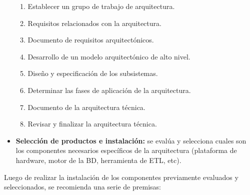 \documentclass[11pt,a4paper]{article}
\begin{document}
\begin{itemize}
				\begin{enumerate}[1.]
					\item Establecer un grupo de trabajo de arquitectura.
					\item Requisitos relacionados con la arquitectura.
					\item Documento de requisitos arquitectónicos.
					\item Desarrollo de un modelo arquitectónico de alto nivel.
					\item Diseño y especificación de los subsistemas.
					\item Determinar las fases de aplicación de la arquitectura.
					\item Documento de la arquitectura técnica.
					\item Revisar y finalizar la arquitectura técnica.
				\end{enumerate}
			
			\item \textbf{Selección de productos e instalación:} se evalúa y selecciona cuales son los componentes necesarios específicos de la arquitectura (plataforma de hardware, motor de la BD, herramienta de ETL, etc).
			
		\end{itemize}
		
		Luego de realizar la instalación de los componentes previamente evaluados y seleccionados, se recomienda una serie de premisas:
		
\end{document}

